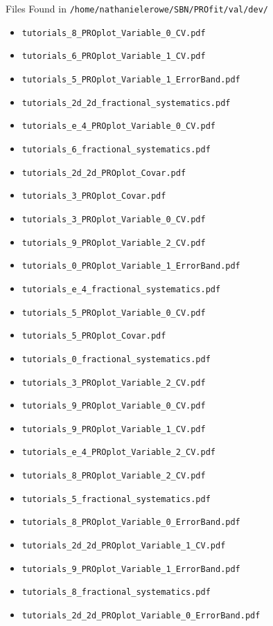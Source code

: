 \documentclass{beamer}
\begin{document}
\begin{frame}{Files Found in \texttt{/home/nathanielerowe/SBN/PROfit/val/dev/}}
\begin{itemize}
    \item \texttt{tutorials\_8\_PROplot\_Variable\_0\_CV.pdf}
    \item \texttt{tutorials\_6\_PROplot\_Variable\_1\_CV.pdf}
    \item \texttt{tutorials\_5\_PROplot\_Variable\_1\_ErrorBand.pdf}
    \item \texttt{tutorials\_2d\_2d\_fractional\_systematics.pdf}
    \item \texttt{tutorials\_e\_4\_PROplot\_Variable\_0\_CV.pdf}
    \item \texttt{tutorials\_6\_fractional\_systematics.pdf}
    \item \texttt{tutorials\_2d\_2d\_PROplot\_Covar.pdf}
    \item \texttt{tutorials\_3\_PROplot\_Covar.pdf}
    \item \texttt{tutorials\_3\_PROplot\_Variable\_0\_CV.pdf}
    \item \texttt{tutorials\_9\_PROplot\_Variable\_2\_CV.pdf}
    \item \texttt{tutorials\_0\_PROplot\_Variable\_1\_ErrorBand.pdf}
    \item \texttt{tutorials\_e\_4\_fractional\_systematics.pdf}
    \item \texttt{tutorials\_5\_PROplot\_Variable\_0\_CV.pdf}
    \item \texttt{tutorials\_5\_PROplot\_Covar.pdf}
    \item \texttt{tutorials\_0\_fractional\_systematics.pdf}
    \item \texttt{tutorials\_3\_PROplot\_Variable\_2\_CV.pdf}
    \item \texttt{tutorials\_9\_PROplot\_Variable\_0\_CV.pdf}
    \item \texttt{tutorials\_9\_PROplot\_Variable\_1\_CV.pdf}
    \item \texttt{tutorials\_e\_4\_PROplot\_Variable\_2\_CV.pdf}
    \item \texttt{tutorials\_8\_PROplot\_Variable\_2\_CV.pdf}
    \item \texttt{tutorials\_5\_fractional\_systematics.pdf}
    \item \texttt{tutorials\_8\_PROplot\_Variable\_0\_ErrorBand.pdf}
    \item \texttt{tutorials\_2d\_2d\_PROplot\_Variable\_1\_CV.pdf}
    \item \texttt{tutorials\_9\_PROplot\_Variable\_1\_ErrorBand.pdf}
    \item \texttt{tutorials\_8\_fractional\_systematics.pdf}
    \item \texttt{tutorials\_2d\_2d\_PROplot\_Variable\_0\_ErrorBand.pdf}

\end{itemize}
\end{frame}
\end{document}
